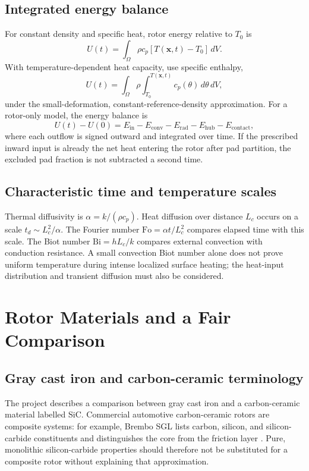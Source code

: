 \documentclass[11pt,a4paper]{article}
\newcommand{\sectionpage}[1]{\clearpage\section{#1}}
\begin{document}
\subsection{Integrated energy balance}
For constant density and specific heat, rotor energy relative to $T_0$ is
\begin{equation}
U(t)=\int_\Omega\rho c_p[T(\mathbf x,t)-T_0]\,dV.
\end{equation}
With temperature-dependent heat capacity, use specific enthalpy,
\begin{equation}
U(t)=\int_\Omega\rho\int_{T_0}^{T(\mathbf x,t)}c_p(\theta)\,d\theta\,dV,
\end{equation}
under the small-deformation, constant-reference-density approximation. For a rotor-only model, the energy balance is
\begin{equation}
U(t)-U(0)=E_{\mathrm{in}}-E_{\mathrm{conv}}-E_{\mathrm{rad}}-E_{\mathrm{hub}}-E_{\mathrm{contact}},
\end{equation}
where each outflow is signed outward and integrated over time. If the prescribed inward input is already the net heat entering the rotor after pad partition, the excluded pad fraction is not subtracted a second time.

\subsection{Characteristic time and temperature scales}
Thermal diffusivity is $\alpha=k/(\rho c_p)$. Heat diffusion over distance $L_c$ occurs on a scale $t_d\sim L_c^2/\alpha$. The Fourier number $\mathrm{Fo}=\alpha t/L_c^2$ compares elapsed time with this scale. The Biot number $\mathrm{Bi}=hL_c/k$ compares external convection with conduction resistance. A small convection Biot number alone does not prove uniform temperature during intense localized surface heating; the heat-input distribution and transient diffusion must also be considered.

\sectionpage{Rotor Materials and a Fair Comparison}
\subsection{Gray cast iron and carbon-ceramic terminology}
The project describes a comparison between gray cast iron and a carbon-ceramic material labelled SiC. Commercial automotive carbon-ceramic rotors are composite systems: for example, Brembo SGL lists carbon, silicon, and silicon-carbide constituents and distinguishes the core from the friction layer \cite{composite}. Pure, monolithic silicon-carbide properties should therefore not be substituted for a composite rotor without explaining that approximation.
\end{document}
